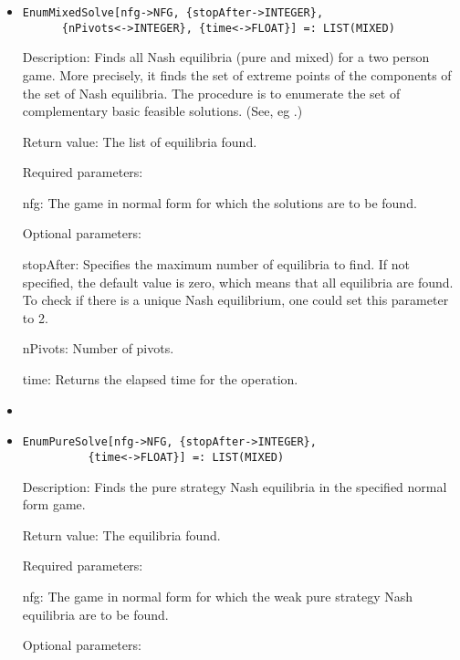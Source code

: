 \begin{itemize}
\item
\protect \large \begin{verbatim}
EnumMixedSolve[nfg->NFG, {stopAfter->INTEGER},
      {nPivots<->INTEGER}, {time<->FLOAT}] =: LIST(MIXED)
\end{verbatim}\normalsize

\bd
\item
[Description:] Finds all Nash equilibria (pure and mixed) for a two
person game.  More precisely, it finds the set of extreme points of
the components of the set of Nash equilibria.  The procedure is to
enumerate the set of complementary basic feasible solutions. (See, eg
\cite[1964]{Man:64}.)
\item
[Return value:] The list of equilibria found.
\item
[Required parameters:]
\bd
\item
[nfg:] The game in normal form for which the solutions are to be found.  
\ed
\item
[Optional parameters:]\hfil\null

\bd
\item
[stopAfter:] Specifies the maximum number of equilibria to find.  If
not specified, the default value is zero, which means that all
equilibria are found.  To check if there is a unique Nash equilibrium,
one could set this parameter to 2.
\item
[nPivots:] Number of pivots. 
\item
[time:] Returns the elapsed time for the operation.
\item
\ed
\ed

\item
\protect \large \begin{verbatim}
EnumPureSolve[nfg->NFG, {stopAfter->INTEGER}, 
          {time<->FLOAT}] =: LIST(MIXED) 
\end{verbatim}\normalsize

\bd
\item
[Description:] Finds the pure strategy Nash equilibria in the
specified normal form game.  
\item
[Return value:] The equilibria
found.  
\item
[Required parameters:]\hfil\null
	
\bd
\item
[nfg:] The game in normal form for which the weak pure strategy Nash
equilibria are to be found.
\ed

\item
[Optional parameters:]\hfil\null
	

\end{itemize}
